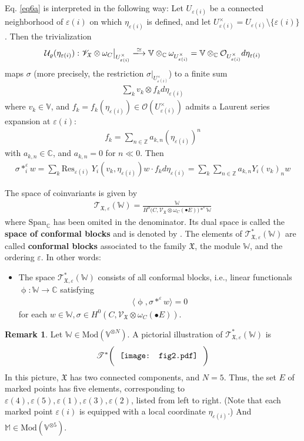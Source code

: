 \documentclass[11pt,b5paper,notitlepage]{article}
\theoremstyle{definition}
\newtheorem{rem}[df]{Remark}
\theoremstyle{plain}
\newcommand{\Res}{\mathrm{Res}}
\newcommand{\SV}{\mathscr{V}}
\newcommand{\Span}{\mathrm{Span}}
\newcommand{\blt}{\bullet}
\newcommand{\Vbb}{\mathbb V}
\newcommand{\Wbb}{\mathbb W}
\newcommand{\Mbb}{\mathbb M}
\newcommand{\Cbb}{\mathbb C}
\newcommand{\Zbb}{\mathbb Z}
\newcommand{\<}{\left\langle}
\renewcommand{\>}{\right\rangle}
\newcommand{\MO}{\mathcal{O}}
\newcommand{\MU}{\mathcal{U}}
\newcommand{\fx}{\mathfrak{X}}
\newcommand{\ST}{\mathscr{T}}
\newcommand{\bk}[1]{\langle {#1}\rangle}
\newcommand{\Mod}{\mathrm{Mod}}
\newcommand{\eps}{\varepsilon}
\numberwithin{equation}{section}
\begin{document}
Eq. \eqref{eq6a} is interpreted in the following way: Let $U_{\eps(i)}$ be a connected neighborhood of $\eps(i)$ on which $\eta_{\eps(i)}$ is defined, and let $U^\times_{\eps(i)}=U_{\eps(i)}\setminus\{\eps(i)\}$. Then the trivialization
\begin{align*}
\MU_\varrho(\eta_{\eps(i)}):\SV_\fx\otimes \omega_C\big|_{U^\times_{\eps(i)}}\xlongrightarrow{\simeq}\Vbb\otimes_\Cbb\omega_{U^\times_{\eps(i)}}=\Vbb\otimes_\Cbb\MO_{U^\times_{\eps(i)}}d\eta_{\eps(i)}
\end{align*}
maps $\sigma$ (more precisely, the restriction $\sigma|_{U^\times_{\eps(i)}}$) to a finite sum
\begin{align*}
\sum_k v_k\otimes f_k d\eta_{\eps(i)}
\end{align*}
where $v_k\in\Vbb$, and $f_k=f_k(\eta_{\eps(i)})\in\MO(U^\times_{\eps(i)})$ admits a Laurent series expansion at $\eps(i)$:
\begin{align*}
f_k=\sum_{n\in\Zbb}a_{k,n}(\eta_{\eps(i)})^n
\end{align*} 
with $a_{k,n}\in\Cbb$, and $a_{k,n}=0$ for $n\ll0$. Then
\begin{align}\label{eq7}
\sigma*^\eps_i w=\sum_k\Res_{\eps(i)}~Y_i(v_k,\eta_{\eps(i)})w\cdot f_kd\eta_{\eps(i)}=\sum_k\sum_{n\in\Zbb}a_{k,n}Y_i(v_k)_nw
\end{align}


The space of coinvariants is given by 
	  \begin{align*}
		\ST_{\fx,\eps}(\Wbb)=\frac{\Wbb}{H^0\big(C,\SV_\fx\otimes \omega_C(\blt E)\big)*^\eps \Wbb}
	  \end{align*}
where $\Span_\Cbb$ has been omited in the denominator. Its dual space is called the \textbf{space of conformal blocks} and is denoted by \pmb{$\ST^*_{\fx,\eps}(\Wbb)$}. The elements of $\ST^*_{\fx,\eps}(\Wbb)$ are called \textbf{conformal blocks} associated to the family $\fx$, the module $\Wbb$, and the ordering $\eps$. In other words:
\begin{itemize}
\item The space $\ST^*_{\fx,\eps}(\Wbb)$ consists of all conformal blocks, i.e., linear functionals $\upphi:\Wbb\rightarrow\Cbb$ satisfying
\begin{align*}
\bk{\upphi,\sigma*^\eps w}=0
\end{align*}
for each $w\in\Wbb,\sigma\in H^0(C,\SV_\fx\otimes\omega_C(\blt E))$.
\end{itemize}

\begin{rem}
Let $\Wbb\in \Mod(\Vbb^{\otimes N})$. A pictorial illustration of $\ST_{\fx,\eps}^*(\Wbb)$ is 
\begin{align*}
	\ST^*\bigg(~\vcenter{\hbox{{
		 \texttt{[image: fig2.pdf]}}}}~~\bigg)
 \end{align*}
In this picture, $\fx$ has two connected components, and $N=5$. Thus, the set $E$ of marked points has five elements, corresponding to $\eps(4),\eps(5),\eps(1),\eps(3),\eps(2)$, listed from left to right. (Note that each marked point $\eps(i)$ is equipped with a local coordinate $\eta_{\eps(i)}$.) And $\Mbb\in\Mod(\Vbb^{\otimes 5})$.
\end{rem} 
\end{document}
